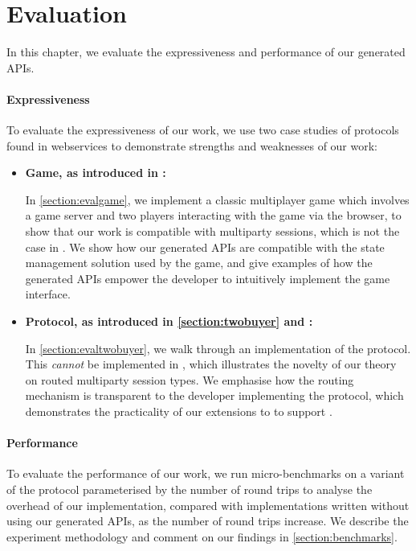 \chapter{Evaluation}
\label{chap:eval}

In this chapter, we
evaluate the expressiveness
and performance of our generated APIs.


\subsubsection{Expressiveness}
To evaluate the expressiveness
of our work,
we use two case studies
of protocols found in webservices
to demonstrate strengths and weaknesses
of our work:

\begin{itemize}

\item
\textbf{ Game, as introduced
in \cite{PLACES2020}:}

In \cref{section:evalgame},
we implement a classic multiplayer game which involves a game server
and two players interacting with the game via the browser,
to show that our work is compatible with multiparty sessions,
which is not the case in \cite{MVU2020,Exceptional}.
We show how our generated APIs are compatible with the
state management solution used by the game, and give examples of 
how the generated APIs empower the developer to intuitively 
implement the game interface.

\item
\textbf{ Protocol, as introduced in 
\cref{section:twobuyer} and \cite{JACM2016,MPAST}:}

In \cref{section:evaltwobuyer},
we walk through an implementation of the 
protocol. This \textit{cannot} be implemented in
\cite{PureScript2019,MVU2020,Exceptional}, 
which illustrates the novelty
of our \newtheory theory on routed multiparty session types.
We emphasise how the routing mechanism is transparent to the
developer implementing the protocol, which demonstrates
the practicality of our extensions to \codegen to support
\newtheory.

\end{itemize}

\subsubsection{Performance}
To evaluate the performance of our work,
we run micro-benchmarks
on a variant of the 
protocol parameterised by the number
of round trips
to analyse the overhead of our implementation,
compared with implementations written
without using our generated APIs,
as the number of round trips increase.
We describe the experiment methodology
and comment on our findings in \cref{section:benchmarks}.





% 

